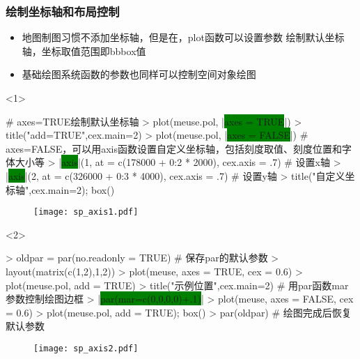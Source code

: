 \subsubsection{绘制坐标轴和布局控制}
\begin{frame}[t,fragile]{\subsecname}{\subsubsecname}
\begin{itemize} 
\item<1-> 地图制图习惯不添加坐标轴，但是在，plot函数可以设置参数
绘制默认坐标轴，坐标取值范围即bbbox值
\item<2-> 基础绘图系统函数的参数也同样可以控制空间对象绘图
\end{itemize}

\begin{overlayarea}{\textwidth}{\textheight}
\begin{onlyenv}<1>
\begin{rcode}
# axes=TRUE绘制默认坐标轴
> plot(meuse.pol, |\colorbox{green}{axes = TRUE}|)
> title("add=TRUE",cex.main=2)
> plot(meuse.pol, |\colorbox{green}{axes = FALSE}|)
# axes=FALSE，可以用axis函数设置自定义坐标轴，包括刻度取值、刻度位置和字体大小等
> |\colorbox{green}{axis}|(1, at = c(178000 + 0:2 * 2000), cex.axis = .7) # 设置x轴
> |\colorbox{green}{axis}|(2, at = c(326000 + 0:3 * 4000), cex.axis = .7) # 设置y轴
> title("自定义坐标轴",cex.main=2); box()
\end{rcode}
\begin{figure}[ht] \vspace{-10pt}
  \centering 
  \texttt{[image: sp\_axis1.pdf]}
\end{figure}
\end{onlyenv}

\begin{onlyenv}<2>
\begin{rcode}
> oldpar = par(no.readonly = TRUE) # 保存par的默认参数
> layout(matrix(c(1,2),1,2))
> plot(meuse, axes = TRUE, cex = 0.6)
> plot(meuse.pol, add = TRUE)
> title("示例位置",cex.main=2)
# 用par函数mar参数控制绘图边框
> |\colorbox{green}{par(mar=c(0,0,0,0)+.1)}|
> plot(meuse, axes = FALSE, cex = 0.6)
> plot(meuse.pol, add = TRUE); box()
> par(oldpar) # 绘图完成后恢复默认参数
\end{rcode}
\begin{figure}[ht] \vspace{-10pt}
  \centering 
  \texttt{[image: sp\_axis2.pdf]}
\end{figure}
\end{onlyenv}
\end{overlayarea}
\end{frame}


